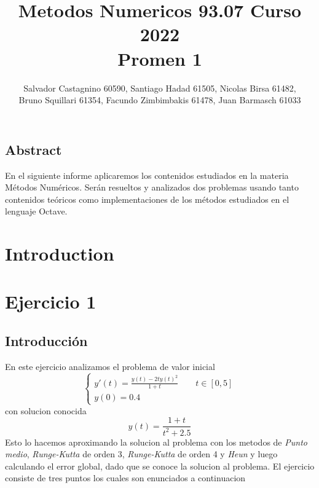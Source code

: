 \documentclass{article}
\author{Salvador Castagnino 60590, Santiago Hadad 61505, Nicolas Birsa 61482,\\ Bruno Squillari 61354, Facundo Zimbimbakis 61478, Juan Barmasch 61033}
\date{}
\title{Metodos Numericos 93.07 Curso 2022 \\ Promen 1}
\begin{document}
\maketitle 

\begin{center}

\section*{Abstract}
En el siguiente informe aplicaremos los contenidos estudiados en la materia Métodos Numéricos. Serán resueltos y analizados dos problemas usando tanto contenidos teóricos como implementaciones de los métodos estudiados en el lenguaje Octave.
\end{center}

\section*{Introduction}

\section*{Ejercicio 1}

\subsection*{Introducción}
En este ejercicio analizamos el problema de valor inicial
\[
\begin{cases}
y' \left( t \right) = \frac{y \left( t \right) -2ty \left( t \right)^2}{1+t} \qquad t \in [0,5] \\
y \left( 0 \right) = 0.4
\end{cases}
\]
con solucion conocida
\[
y \left( t \right) = \frac{1+t}{t^2+2.5}
\]
Esto lo hacemos aproximando la solucion al problema con los metodos de \textit{Punto medio}, \textit{Runge-Kutta} de orden 3, \textit{Runge-Kutta} de orden 4 y \textit{Heun} y luego calculando el error global, dado que se conoce la solucion al problema. El ejercicio consiste de tres puntos los cuales son enunciados a continuacion
\end{document}
